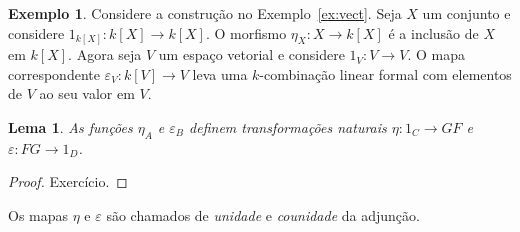 \documentclass[12pt]{amsart}
\newtheorem{lemma}[theorem]{Lema}
\theoremstyle{definition}
\newtheorem{example}[theorem]{Exemplo}
\begin{document}
\begin{example}
    Considere a construção no Exemplo~\ref{ex:vect}.
    Seja $X$ um conjunto e considere $1_{k[X]}:k[X]\to k[X]$. O morfismo $\eta_X: X\to k[X]$ é 
    a inclusão de $X$ em $k[X]$. Agora seja $V$ um espaço vetorial e considere $1_V:V\to V$. 
    O mapa correspondente $\varepsilon_V:k[V]\to V$ leva uma $k$-combinação linear formal 
    com elementos de $V$ ao seu valor em $V$. 
\end{example}

\begin{lemma}
As funções $\eta_A$ e $\varepsilon_B$ definem transformações naturais $\eta: 1_C\to GF$ e $\varepsilon:FG\to 1_D$.
\end{lemma}
\begin{proof}
    Exercício.
\end{proof}
Os mapas $\eta$ e $\varepsilon$ são chamados de \emph{unidade} e \emph{counidade} da adjunção.
\end{document}
